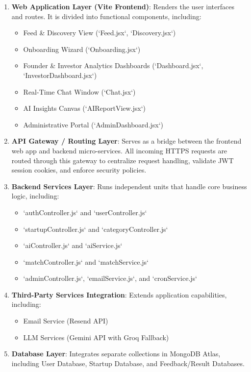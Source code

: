 \documentclass[12pt,a4paper]{report}
\begin{document}
\begin{enumerate}
    \item \textbf{Web Application Layer (Vite Frontend)}: Renders the user interfaces and routes. It is divided into functional components, including:
    \begin{itemize}
        \item Feed & Discovery View (`Feed.jsx`, `Discovery.jsx`)
        \item Onboarding Wizard (`Onboarding.jsx`)
        \item Founder & Investor Analytics Dashboards (`Dashboard.jsx`, `InvestorDashboard.jsx`)
        \item Real-Time Chat Window (`Chat.jsx`)
        \item AI Insights Canvas (`AIReportView.jsx`)
        \item Administrative Portal (`AdminDashboard.jsx`)
    \end{itemize}
    \item \textbf{API Gateway / Routing Layer}: Serves as a bridge between the frontend web app and backend micro-services. All incoming HTTPS requests are routed through this gateway to centralize request handling, validate JWT session cookies, and enforce security policies.
    \item \textbf{Backend Services Layer}: Runs independent units that handle core business logic, including:
    \begin{itemize}
        \item `authController.js` and `userController.js`
        \item `startupController.js` and `categoryController.js`
        \item `aiController.js` and `aiService.js`
        \item `matchController.js` and `matchService.js`
        \item `adminController.js`, `emailService.js`, and `cronService.js`
    \end{itemize}
    \item \textbf{Third-Party Services Integration}: Extends application capabilities, including:
    \begin{itemize}
        \item Email Service (Resend API)
        \item LLM Services (Gemini API with Groq Fallback)
    \end{itemize}
    \item \textbf{Database Layer}: Integrates separate collections in MongoDB Atlas, including User Database, Startup Database, and Feedback/Result Databases.
\end{enumerate}
\end{document}
